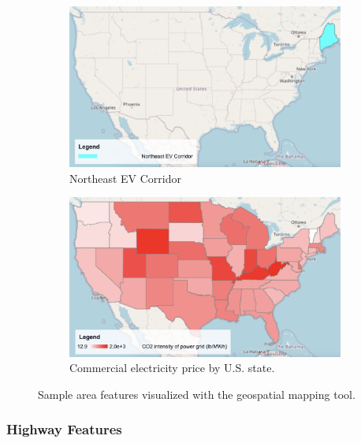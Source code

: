 \begin{figure}[ht]
    \centering
    \begin{subfigure}[b]{0.49\textwidth}
        \centering
        \includegraphics[width=\textwidth]{figures/northeast_ev_corridor.png}
        \caption{Northeast EV Corridor}
        \label{fig:northeast_ev_corridor}
    \end{subfigure}
    \hfill
    \begin{subfigure}[b]{0.49\textwidth}
        \centering
        \includegraphics[width=\textwidth]{figures/grid_co2_intensity_state.png}
        \caption{Commercial electricity price by U.S. state.}
        \label{fig:grid_co2_intensity_state}
    \end{subfigure}
    \caption{Sample area features visualized with the geospatial mapping tool.}
    \label{fig:area_features}
\end{figure}

\subsubsection{Highway Features}

